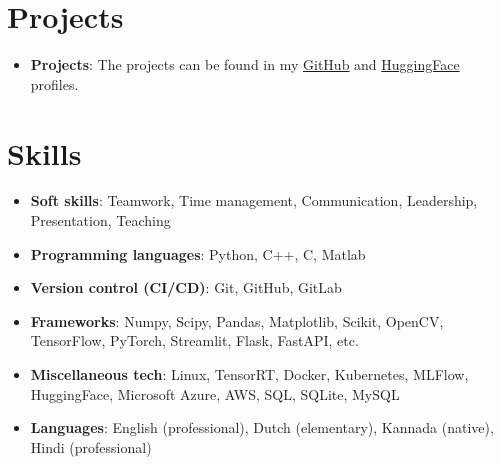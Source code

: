 \documentclass[letterpaper, 10pt]{article}
\newcommand{\resumeItem}[2]{
    \item\small{
        \textbf{#1}{: #2 \vspace{-2pt}}
    }
}
\newcommand{\resumeSubItem}[2]{\resumeItem{#1}{#2}\vspace{-4pt}}
\newcommand{\resumeSubHeadingListStart}{\begin{itemize}[leftmargin=*]}
\newcommand{\resumeSubHeadingListEnd}{\end{itemize}\vspace{-5pt}}
\begin{document}

\section{Projects}
    \resumeSubHeadingListStart
        \resumeSubItem{Projects}
        {The projects can be found in my \href{https://github.com/AbhishekRS4/}{GitHub} and \href{https://huggingface.co/abhishekrs4}{HuggingFace} profiles.}
    \resumeSubHeadingListEnd

\section{Skills}
    \resumeSubHeadingListStart
        \resumeSubItem{Soft skills}
        {Teamwork, Time management, Communication, Leadership, Presentation, Teaching}
        \resumeSubItem{Programming languages}
        {Python, C++, C, Matlab}
        \resumeSubItem{Version control (CI/CD)}
        {Git, GitHub, GitLab}
        \resumeSubItem{Frameworks}
        {Numpy, Scipy, Pandas, Matplotlib, Scikit, OpenCV, TensorFlow, PyTorch, Streamlit, Flask, FastAPI, etc.}
        \resumeSubItem{Miscellaneous tech}
        {Linux, TensorRT, Docker, Kubernetes, MLFlow, HuggingFace, Microsoft Azure, AWS, SQL, SQLite, MySQL}
        \resumeSubItem{Languages}
        {English (professional), Dutch (elementary), Kannada (native), Hindi (professional)}
    \resumeSubHeadingListEnd
\end{document}
